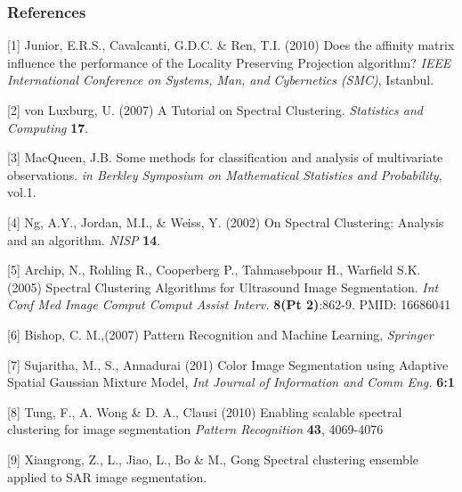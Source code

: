 \documentclass[12pt,letterpaper]{article}
\begin{document}
\subsubsection*{References}
\small{

[1] Junior, E.R.S., Cavalcanti, G.D.C. \& Ren, T.I. (2010) Does the affinity matrix
influence the performance of the Locality Preserving Projection algorithm? 
{\it IEEE International Conference on Systems, Man, and Cybernetics (SMC)}, Istanbul. 

[2] von Luxburg, U. (2007) A Tutorial on Spectral Clustering. {\it Statistics 
and Computing} {\bf 17}.

[3] MacQueen, J.B. Some methods for classification and analysis of multivariate 
observations. {\it in Berkley Symposium on Mathematical Statistics and Probability},
vol.1.

[4] Ng, A.Y., Jordan, M.I., \& Weiss, Y. (2002) On Spectral Clustering: Analysis
and an algorithm. {\it NISP} {\bf14}.

[5] Archip, N., Rohling R., Cooperberg P., Tahmasebpour H., Warfield S.K. (2005) Spectral 
Clustering Algorithms for Ultrasound Image Segmentation. 
{\it Int Conf Med Image Comput Comput Assist Interv.} {\bf 8(Pt 2)}:862-9. PMID: 16686041

[6]  Bishop, C. M.,(2007) Pattern Recognition and Machine Learning, {\it Springer}

[7] Sujaritha, M., S., Annadurai (201) Color Image Segmentation using Adaptive Spatial
Gaussian Mixture Model, {\it Int Journal of Information and Comm Eng.} {\bf 6:1}

[8] Tung, F., A. Wong \& D. A., Clausi (2010) Enabling scalable spectral clustering for image
 segmentation {\it Pattern Recognition} {\bf 43}, 4069-4076

[9] Xiangrong, Z., L., Jiao, L., Bo \& M., Gong Spectral clustering ensemble applied to SAR
 image segmentation.%
}



% 
\end{document}
